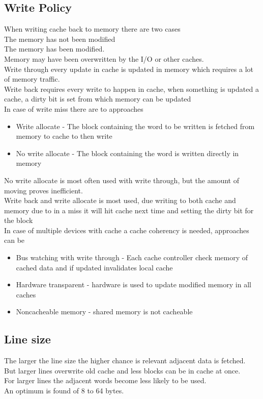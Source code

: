 \documentclass[12pt, a4paper]{article}
\begin{document}
		\subsection{Write Policy}
			When writing cache back to memory there are two cases\\
			The memory has not been modified\\
			The memory has been modified.\\
			Memory may have been overwritten by the I/O or other caches.\\
			Write through every update in cache is updated in memory which requires a lot of memory traffic.\\
			Write back requires every write to happen in cache, when something is updated a cache, a dirty bit is set from which memory can be updated\\
			In case of write miss there are to approaches
			\begin{itemize}
				\item Write allocate - The block containing the word to be written is fetched from memory to cache to then write
				\item No write allocate - The block containing the word is written directly in memory
			\end{itemize}
			No write allocate is most often used with write through, but the amount of moving proves inefficient.\\
			Write back and write allocate is most used, due writing to both cache and memory due to in a miss it will hit cache next time and setting the dirty bit for the block\\
			In case of multiple devices with cache a cache coherency is needed, approaches can be
			\begin{itemize}
				\item Bus watching with write through - Each cache controller check memory of cached data and if updated invalidates local cache
				\item Hardware transparent - hardware is used to update modified memory in all caches
				\item Noncacheable memory - shared memory is not cacheable
			\end{itemize}
		\subsection{Line size}
			The larger the line size the higher chance is relevant adjacent data is fetched.\\
			But larger lines overwrite old cache and less blocks can be in cache at once.\\
			For larger lines the adjacent words become less likely to be used.\\
			An optimum is found of 8 to 64 bytes.
\end{document}
